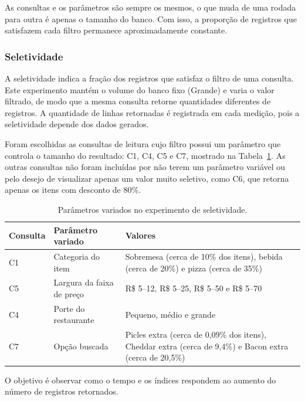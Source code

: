 As consultas e os
parâmetros são sempre os mesmos, o que muda de uma rodada para outra é apenas o
tamanho do banco. Com isso, a proporção de registros que satisfazem cada filtro
permanece aproximadamente constante. 

\subsubsection{Seletividade}

A seletividade indica a fração dos registros que satisfaz o filtro de uma
consulta. Este experimento mantém o volume do banco fixo (Grande) e varia o valor
filtrado, de modo que a mesma consulta retorne quantidades diferentes de
registros. A quantidade de linhas retornadas é
registrada em cada medição, pois a seletividade depende dos dados gerados.

Foram escolhidas as consultas de leitura cujo filtro possui um parâmetro que
controla o tamanho do resultado: C1, C4, C5 e C7, mostrado na Tabela~\ref{tab:seletividade}. 
As outras consultas não foram incluídas por não terem um parâmetro variável ou pelo desejo de visualizar apenas um valor muito seletivo, como C6, que retorna apenas os itens com desconto de 80\%.

\begin{table}[H]
    \centering
    \renewcommand{\arraystretch}{1.1}
    \caption{Parâmetros variados no experimento de seletividade.}
    \label{tab:seletividade}
    \footnotesize
    \begin{tabular}{|l|p{4cm}|p{7cm}|}
        \hline
        \textbf{Consulta} & \textbf{Parâmetro variado} & \textbf{Valores} \\ \hline
        C1 & Categoria do item & Sobremesa (cerca de 10\% dos itens), bebida (cerca de 20\%) e pizza (cerca de 35\%) \\ \hline
        C5 & Largura da faixa de preço & R\$ 5--12, R\$ 5--25, R\$ 5--50 e R\$ 5--70 \\ \hline
        C4 & Porte do restaurante & Pequeno, médio e grande \\ \hline
        C7 & Opção buscada & Picles extra (cerca de 0,09\% dos itens), Cheddar extra (cerca de 9,4\%) e Bacon extra (cerca de 20,5\%) \\ \hline
    \end{tabular}
    \vspace{0.4em}
\end{table}

O objetivo é observar como o tempo e os índices respondem ao aumento do número de registros
retornados.

